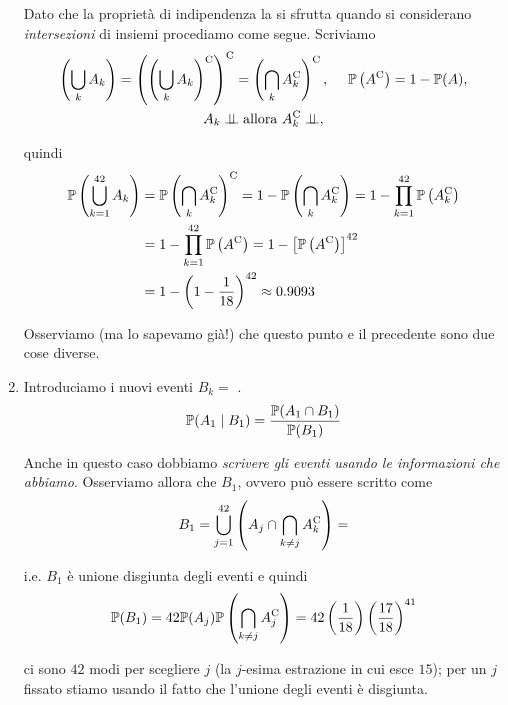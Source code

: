 \begin{enumerate}
Dato che la proprietà di indipendenza la si sfrutta quando si considerano \textit{intersezioni} di insiemi procediamo come segue. Scriviamo
\begin{gather*}
\left(\bigcup _{k} A_{k}\right) =\left(\left(\bigcup _{k} A_{k}\right)\complementary\right)\complementary =\left(\bigcap _{k} A_{k}\complementary\right)\complementary ,\ \ \ \ \PP\left(A\complementary\right) =1-\PP(A) ,\\
A_{k} \indep \text{allora} \ A_{k}\complementary \indep ,
\end{gather*}

quindi
\begin{align*}
\mathbb{P}\left(\bigcup _{k=1}^{42} A_{k}\right) & =\mathbb{P}\left(\bigcap _{k} A_{k}^{\mathrm{C}}\right)^{\mathrm{C}} =1-\mathbb{P}\left(\bigcap _{k} A_{k}^{\mathrm{C}}\right) =1-\prod _{k=1}^{42}\mathbb{P}\left(A_{k}^{\mathrm{C}}\right)\\
 & =1-\prod _{k=1}^{42}\mathbb{P}\left(A^{\mathrm{C}}\right) =1-\left[\mathbb{P}\left(A^{\mathrm{C}}\right)\right]^{42}\\
 & =1-\left(1-\frac{1}{18}\right)^{42} \approx 0.9093
\end{align*}

\begin{oss}
Osserviamo (ma lo sapevamo già!) che questo punto e il precedente sono due cose diverse.
\end{oss}
\item Introduciamo i nuovi eventi $B_{k} =$ .
\begin{equation*}
\mathbb{P}(A_{1} \mid B_{1}) =\frac{\mathbb{P}(A_{1} \cap B_{1})}{\mathbb{P}(B_{1})}
\end{equation*}

Anche in questo caso dobbiamo \textit{scrivere gli eventi usando le informazioni che abbiamo}. Osserviamo allora che $B_{1}$, ovvero  può essere scritto come
\begin{equation*}
B_{1} =\bigcup _{j=1}^{42}\left(A_{j} \cap \bigcap _{k\neq j} A_{k}^{\mathrm{C}}\right) =
\end{equation*}

i.e. $B_{1}$ è unione disgiunta degli eventi  e quindi
\begin{equation*}
\mathbb{P}(B_{1}) =42\mathbb{P}(A_{j})\mathbb{P}\left(\bigcap _{k\neq j} A_{j}^{\mathrm{C}}\right) =42\left(\frac{1}{18}\right)\left(\frac{17}{18}\right)^{41}
\end{equation*}

ci sono $42$ modi per scegliere $j$ (la $j$-esima estrazione in cui esce $15$); per un $j$ fissato stiamo usando il fatto che l'unione degli eventi è disgiunta.


\end{enumerate}
